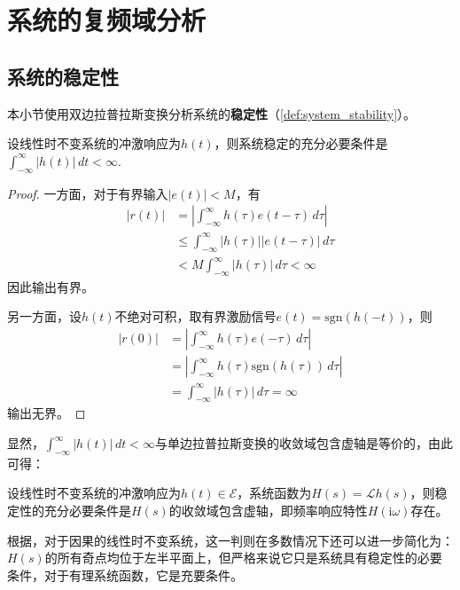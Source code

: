 \section{系统的复频域分析}\label{sec:Complex_Freq_Analysis}

\subsection{系统的稳定性}\label{sub:stability_of_system}
本小节使用双边拉普拉斯变换分析系统的\textbf{稳定性}（\cref{def:system_stability}）。
\begin{proposition}[稳定性的时域判则]
    设线性时不变系统的冲激响应为$h(t)$，则系统稳定的充分必要条件是$\int_{-\infty}^{\infty}|h(t)|\,dt<\infty$.
\end{proposition}
\begin{proof}
    一方面，对于有界输入$|e(t)|<M$，有
    \begin{align*}
        |r(t)|&=\left|\int_{-\infty}^{\infty}h(\tau)e(t-\tau)\,d\tau\right|\\
        &\leq \int_{-\infty}^{\infty}|h(\tau)||e(t-\tau)|\,d\tau\\
        &<M\int_{-\infty}^{\infty}|h(\tau)|\,d\tau<\infty
    \end{align*}
    因此输出有界。

    另一方面，设$h(t)$不绝对可积，取有界激励信号$e(t)=\mathrm{sgn}(h(-t))$，则
    \begin{align*}
        |r(0)|&=\left|\int_{-\infty}^{\infty}h(\tau)e(-\tau)\,d\tau\right|\\
        &=\left|\int_{-\infty}^{\infty}h(\tau)\mathrm{sgn}(h(\tau))\,d\tau\right|\\
        &=\int_{-\infty}^{\infty}|h(\tau)|\,d\tau=\infty
    \end{align*}
    输出无界。
\end{proof}

显然，$\int_{-\infty}^{\infty}|h(t)|\,dt<\infty$与单边拉普拉斯变换的收敛域包含虚轴是等价的，由此可得：

\begin{proposition}[稳定性的复频域判则]\label{prop:statibility_s}
    设线性时不变系统的冲激响应为$h(t)\in\mathcal{E}$，系统函数为$H(s)=\mathcal{L} h(s)$，则稳定性的充分必要条件是$H(s)$的收敛域包含虚轴，即频率响应特性$H(\mathrm{i}\omega)$存在。
\end{proposition}

根据，对于因果的线性时不变系统，这一判则在多数情况下还可以进一步简化为：$H(s)$的所有奇点均位于左半平面上，但严格来说它只是系统具有稳定性的必要条件，对于有理系统函数，它是充要条件。

